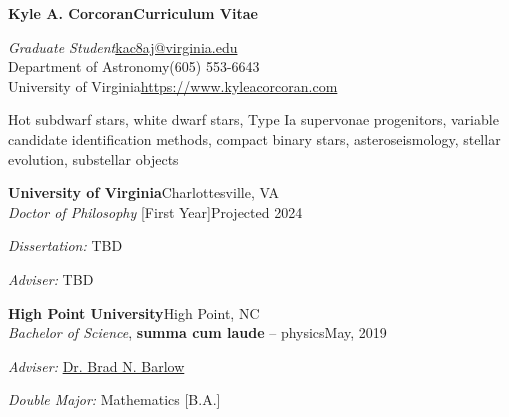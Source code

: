 \documentclass[letterpaper,12pt]{article}
\begin{document}
\noindent\textbf{\huge{Kyle A. Corcoran}\hfill\Large{Curriculum Vitae}}\\
\vspace{-3mm}

\noindent\textit{Graduate Student}\hfill\href{mailto:kac8aj@virginia.edu}{kac8aj@virginia.edu}\\
\noindent Department of Astronomy\hfill(605) 553-6643\\
\noindent University of Virginia\hfill\url{https://www.kyleacorcoran.com}\\

\noindent{}

\vspace{2mm}
\begin{minipage}{6.1in}
Hot subdwarf stars, white dwarf stars, Type Ia supervonae progenitors, variable candidate identification methods, compact binary stars, asteroseismology, stellar evolution, substellar objects
\end{minipage}

\vspace{3mm}
\noindent{}

\vspace{2mm}
\begin{minipage}{6.1in}
\textbf{University of Virginia}\hfill Charlottesville, VA\\ %
\textit{Doctor of Philosophy} [First Year]\hfill Projected 2024

\hspace{0.5in} \textit{Dissertation:} TBD

\hspace{0.5in} \textit{Adviser:} TBD

\vspace{2mm}
\textbf{High Point University}\hfill High Point, NC\\
\textit{Bachelor of Science}, \textbf{summa cum laude} -- physics\hfill May, 2019

\hspace{0.5in} \textit{Adviser:} \href{http://physics.highpoint.edu/~bbarlow/}{\textcolor{rotundaorange}{Dr. Brad N. Barlow}}

\hspace{0.5in} \textit{Double Major:} Mathematics [B.A.]

\end{minipage}
\end{document}
